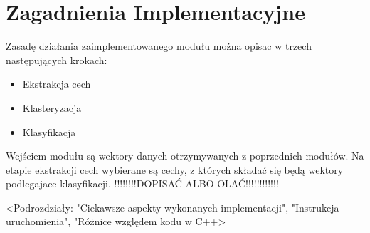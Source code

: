 \section{Zagadnienia Implementacyjne}

Zasadę działania zaimplementowanego modułu można opisac w trzech następujących krokach:
\begin{itemize}
	\item Ekstrakcja cech
	\item Klasteryzacja
	\item Klasyfikacja
\end{itemize}

Wejściem modułu są wektory danych otrzymywanych z poprzednich modułów. Na etapie ekstrakcji cech wybierane są cechy, z których składać się będą wektory podlegajace klasyfikacji. !!!!!!!!DOPISAĆ ALBO OLAĆ!!!!!!!!!!!!


<Podrozdziały: "Ciekawsze aspekty wykonanych implementacji", "Instrukcja uruchomienia", "Różnice względem kodu w C++>